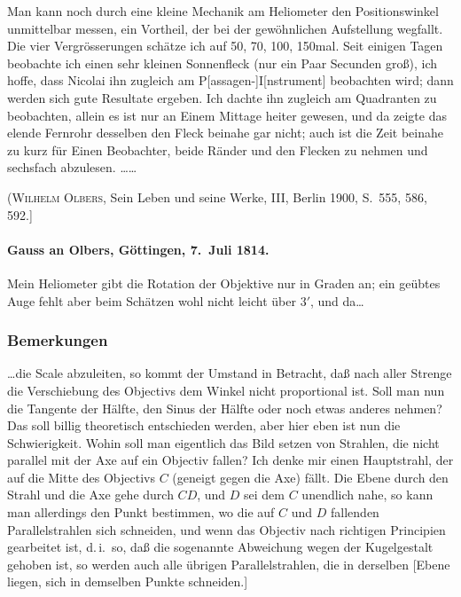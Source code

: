 \documentclass[12pt,a4paper]{article}
\theoremstyle{plain}
\theoremstyle{definition}
\theoremstyle{remark}
\begin{document}
Man kann noch durch eine kleine Mechanik am Heliometer den Positionswinkel unmittelbar messen, ein Vortheil, der bei der gewöhnlichen Aufstellung wegfallt. Die vier Vergrösserungen schätze ich auf 50, 70, 100, 150mal. Seit einigen Tagen beobachte ich einen sehr kleinen Sonnenfleck (nur ein Paar Secunden groß), ich hoffe, dass Nicolai ihn zugleich am P[assagen-]I[nstrument] beobachten wird; dann werden sich gute Resultate ergeben. Ich dachte ihn zugleich am Quadranten zu beobachten, allein es ist nur an Einem Mittage heiter gewesen, und da zeigte das elende Fernrohr desselben den Fleck beinahe gar nicht; auch ist die Zeit beinahe zu kurz für Einen Beobachter, beide Ränder und den Flecken zu nehmen und sechsfach abzulesen.\,\,\ldots\ldots

(\textsc{Wilhelm Olbers}, Sein Leben und seine Werke, III, Berlin 1900, S.~555, 586, 592.]

\paragraph{Gauss an Olbers, Göttingen, 7.~Juli 1814.}

Mein Heliometer gibt die Rotation der Objektive nur in Graden an; ein geübtes Auge fehlt aber beim Schätzen wohl nicht leicht über $3'$, und da\ldots

\newpage
\subsubsection*{Bemerkungen}

\ldots die Scale abzuleiten, so kommt der Umstand in Betracht, daß nach aller Strenge die Verschiebung des Objectivs dem Winkel nicht proportional ist. Soll man nun die Tangente der Hälfte, den Sinus der Hälfte oder noch etwas anderes nehmen? Das soll billig theoretisch entschieden werden, aber hier eben ist nun die Schwierigkeit. Wohin soll man eigentlich das Bild setzen von Strahlen, die nicht parallel mit der Axe auf ein Objectiv fallen? Ich denke mir einen Hauptstrahl, der auf die Mitte des Objectivs $C$ (geneigt gegen die Axe) fällt. Die Ebene durch den Strahl und die Axe gehe durch $CD$, und $D$ sei dem $C$ unendlich nahe, so kann man allerdings den Punkt bestimmen, wo die auf $C$ und $D$ fallenden Parallelstrahlen sich schneiden, und wenn das Objectiv nach richtigen Principien gearbeitet ist, d.\,i.\ so, daß die sogenannte Abweichung wegen der Kugelgestalt gehoben ist, so werden auch alle übrigen Parallelstrahlen, die in derselben [Ebene liegen, sich in demselben Punkte schneiden.]
\end{document}
